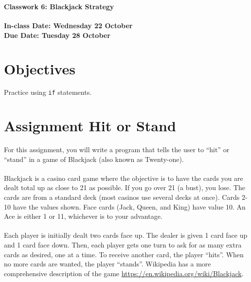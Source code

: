 \documentclass[letter,10pt]{article}
\begin{document}
    
    \huge
    \textbf{Classwork 6: Blackjack Strategy}
    \normalsize
    \\ ~~ \\
    \textbf{In-class Date: Wednesday 22 October} \\
    \textbf{Due Date: Tuesday 28 October}
    
    \section*{Objectives}
    \paragraph{}Practice using \texttt{if} statements.
    
    \section*{Assignment Hit or Stand}
    \paragraph{}For this assignment, you will write a program that tells the user to ``hit'' or ``stand'' in a game of Blackjack (also known as Twenty-one).
    \paragraph{}Blackjack is a casino card game where the objective is to have the cards you are dealt total up as close to 21 as possible. If you go over 21 (a bust), you lose. The cards are from a standard deck (most casinos use several decks at once). Cards 2-10 have the values shown. Face cards (Jack, Queen, and King) have value 10. An Ace is either 1 or 11, whichever is to your advantage.
    \paragraph{}Each player is initially dealt two cards face up. The dealer is given 1 card face up and 1 card face down. Then, each player gets one turn to ask for as many extra cards as desired, one at a time. To receive another card, the player ``hits''. When no more cards are wanted, the player ``stands''. Wikipedia has a more comprehensive description of the game \url{https://en.wikipedia.org/wiki/Blackjack}.
\end{document}

